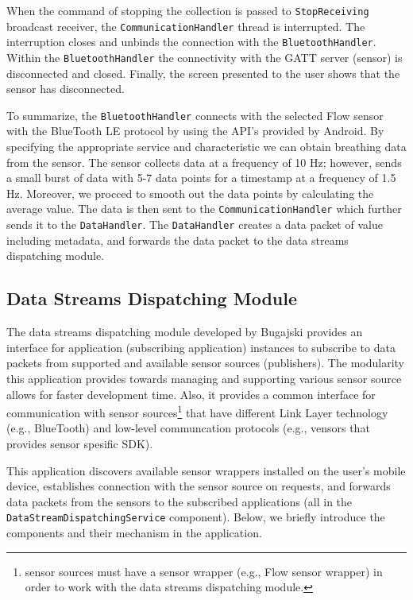 When the command of stopping the collection is passed to \verb|StopReceiving| broadcast receiver, the \verb|CommunicationHandler| thread is interrupted. The interruption closes and unbinds the connection with the \verb|BluetoothHandler|. Within the \verb|BluetoothHandler| the connectivity with the GATT server (sensor) is disconnected and closed. Finally, the screen presented to the user shows that the sensor has disconnected.

To summarize, the \verb|BluetoothHandler| connects with the selected Flow sensor with the BlueTooth LE protocol by using the API's provided by Android. By specifying the appropriate service and characteristic we can obtain breathing data from the sensor. The sensor collects data at a frequency of 10 Hz; however, sends a small burst of data with 5-7 data points for a timestamp at a frequency of 1.5 Hz. Moreover, we procced to smooth out the data points by calculating the average value. The data is then sent to the \verb|CommunicationHandler| which further sends it to the \verb|DataHandler|. The \verb|DataHandler| creates a data packet of value including metadata, and forwards the data packet to the data streams dispatching module.  


\subsection{Data Streams Dispatching Module}\label{imp:dsdm}
The data streams dispatching module developed by Bugajski \cite{daniel} provides an interface for application (subscribing application) instances to subscribe to data packets from supported and available sensor sources (publishers). The modularity this application provides towards managing and supporting various sensor source allows for faster development time. Also, it provides a common interface for communication with sensor sources\footnote{sensor sources must have a sensor wrapper (e.g., Flow sensor wrapper) in order to work with the data streams dispatching module.} that have different Link Layer technology (e.g., BlueTooth) and low-level communcation protocols (e.g., vensors that provides sensor spesific SDK). 

This application discovers available sensor wrappers installed on the user's mobile device, establishes connection with the sensor source on requests, and forwards data packets from the sensors to the subscribed applications (all in the \verb|DataStreamDispatchingService| component). Below, we briefly introduce the components and their mechanism in the application.

